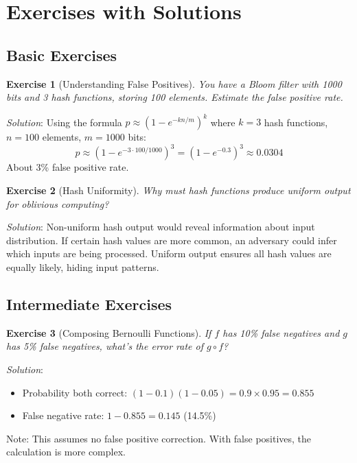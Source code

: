 \documentclass[11pt]{article}
\newtheorem{exercise}{Exercise}[section]
\begin{document}
\section{Exercises with Solutions}

\subsection{Basic Exercises}

\begin{exercise}[Understanding False Positives]
You have a Bloom filter with 1000 bits and 3 hash functions, storing 100 elements. Estimate the false positive rate.
\end{exercise}

\textit{Solution}: Using the formula $p \approx (1-e^{-kn/m})^k$ where $k=3$ hash functions, $n=100$ elements, $m=1000$ bits:
\[p \approx (1-e^{-3 \cdot 100/1000})^3 = (1-e^{-0.3})^3 \approx 0.0304\]
About 3\% false positive rate.

\begin{exercise}[Hash Uniformity]
Why must hash functions produce uniform output for oblivious computing?
\end{exercise}

\textit{Solution}: Non-uniform hash output would reveal information about input distribution. If certain hash values are more common, an adversary could infer which inputs are being processed. Uniform output ensures all hash values are equally likely, hiding input patterns.

\subsection{Intermediate Exercises}

\begin{exercise}[Composing Bernoulli Functions]
If $f$ has 10\% false negatives and $g$ has 5\% false negatives, what's the error rate of $g \circ f$?
\end{exercise}

\textit{Solution}: 
\begin{itemize}
    \item Probability both correct: $(1-0.1)(1-0.05) = 0.9 \times 0.95 = 0.855$
    \item False negative rate: $1 - 0.855 = 0.145$ (14.5\%)
\end{itemize}
Note: This assumes no false positive correction. With false positives, the calculation is more complex.
\end{document}
